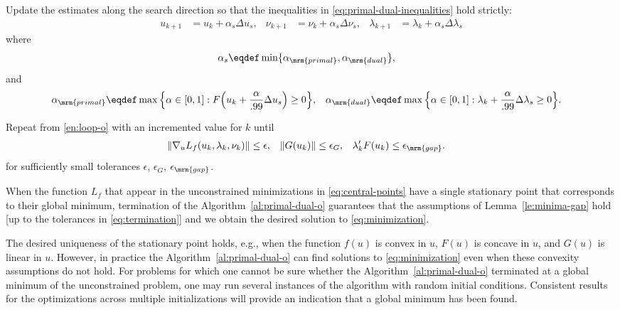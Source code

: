 \documentclass[11pt]{article}
\begin{document}
\begin{algorithm}
\begin{steps}
\item Update the estimates along the search direction so that the
  inequalities in \eqref{eq:primal-dual-inequalities} hold
  strictly:
  \begin{align*}
    u_{k+1}&=u_k+\alpha_s\Delta u_s, &
    \nu_{k+1}&=\nu_k+\alpha_s \Delta \nu_s, &
    \lambda_{k+1}&=\lambda_k+\alpha_s \Delta \lambda_s
  \end{align*}
  where
  \begin{align*}
    \alpha_s&\eqdef\min\{\alpha_\mrm{primal},\alpha_\mrm{dual}\}, 
  \end{align*}
  and
  \begin{align}
    \alpha_\mrm{primal}&\eqdef \max\Big\{\alpha\in[0,1]:F\Big(u_k+\frac{\alpha}{.99} \Delta u_s\Big)\ge 0\Big\}, &
    \alpha_\mrm{dual}&\eqdef \max\Big\{\alpha\in[0,1]:\lambda_k+\frac{\alpha}{.99} \Delta\lambda_s\ge 0 \Big\}.
  \end{align}

\item Repeat from \ref{en:loop-o} with an incremented value for $k$ until
  \begin{align}\label{eq:termination}
    \|\nabla_u L_f(u_k,\lambda_k,\nu_k)\|&\le \epsilon, &
    \|G(u_k)\|&\le \epsilon_G, &
    \lambda_k 'F(u_k)&\le \epsilon_\mrm{gap}.
  \end{align}
  for sufficiently small tolerances $\epsilon$, $\epsilon_G$, $\epsilon_\mrm{gap}$. \frqed
\end{steps}
\end{algorithm}

When the function $L_f$ that appear in the unconstrained minimizations
in \eqref{eq:central-points} have a single stationary point that
corresponds to their global minimum, termination of the
Algorithm~\ref{al:primal-dual-o} guarantees that the assumptions of
Lemma~\ref{le:minima-gap} hold [up to the tolerances in
\eqref{eq:termination}] and we obtain the desired solution to
\eqref{eq:minimization}.

\medskip

The desired uniqueness of the stationary point holds, e.g., when the
function $f(u)$ is convex in $u$, $F(u)$ is concave in $u$, and $G(u)$
is linear in $u$. However, in practice the
Algorithm~\ref{al:primal-dual-o} can find solutions to
\eqref{eq:minimization} even when these convexity assumptions do not
hold. For problems for which one cannot be sure whether the
Algorithm~\ref{al:primal-dual-o} terminated at a global minimum of the
unconstrained problem, one may run several instances of the algorithm
with random initial conditions. Consistent results for the
optimizations across multiple initializations will provide an
indication that a global minimum has been found.
\end{document}
